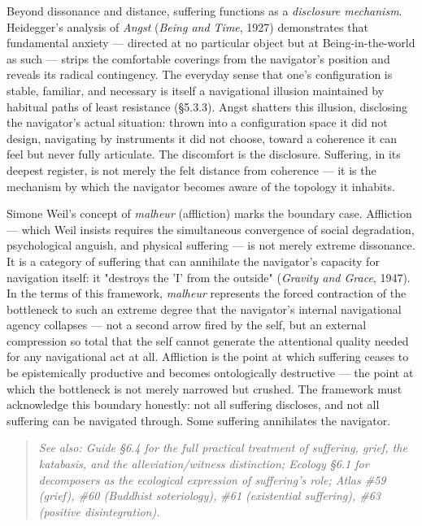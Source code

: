 Beyond dissonance and distance, suffering functions as a \textit{disclosure mechanism}. Heidegger's analysis of \textit{Angst} (\textit{Being and Time}, 1927) demonstrates that fundamental anxiety — directed at no particular object but at Being-in-the-world as such — strips the comfortable coverings from the navigator's position and reveals its radical contingency. The everyday sense that one's configuration is stable, familiar, and necessary is itself a navigational illusion maintained by habitual paths of least resistance (§5.3.3). Angst shatters this illusion, disclosing the navigator's actual situation: thrown into a configuration space it did not design, navigating by instruments it did not choose, toward a coherence it can feel but never fully articulate. The discomfort is the disclosure. Suffering, in its deepest register, is not merely the felt distance from coherence — it is the mechanism by which the navigator becomes aware of the topology it inhabits.


Simone Weil's concept of \textit{malheur} (affliction) marks the boundary case. Affliction — which Weil insists requires the simultaneous convergence of social degradation, psychological anguish, and physical suffering — is not merely extreme dissonance. It is a category of suffering that can annihilate the navigator's capacity for navigation itself: it "destroys the 'I' from the outside" (\textit{Gravity and Grace}, 1947). In the terms of this framework, \textit{malheur} represents the forced contraction of the bottleneck to such an extreme degree that the navigator's internal navigational agency collapses — not a second arrow fired by the self, but an external compression so total that the self cannot generate the attentional quality needed for any navigational act at all. Affliction is the point at which suffering ceases to be epistemically productive and becomes ontologically destructive — the point at which the bottleneck is not merely narrowed but crushed. The framework must acknowledge this boundary honestly: not all suffering discloses, and not all suffering can be navigated through. Some suffering annihilates the navigator.


\begin{quote}
\itshape
\textit{See also: Guide §6.4 for the full practical treatment of suffering, grief, the katabasis, and the alleviation/\allowbreak witness distinction; Ecology §6.1 for decomposers as the ecological expression of suffering's role; Atlas \#59 (grief), \#60 (Buddhist soteriology), \#61 (existential suffering), \#63 (positive disintegration).}
\end{quote}
